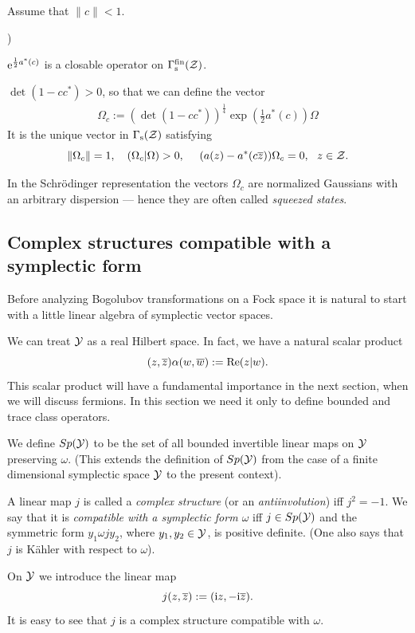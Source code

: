 \documentclass{svmult}
\newcounter{smallarabics}
\newenvironment{arabicenumerate}
{\begin{list}{{\normalfont\textrm{\arabic{smallarabics})}}}
  {\usecounter{smallarabics}\setlength{\itemindent}{0cm}
   \setlength{\leftmargin}{5ex}\setlength{\labelwidth}{4ex}
   \setlength{\topsep}{0.75\parsep}\setlength{\partopsep}{0ex}
   \setlength{\itemsep}{0ex}}}
{\end{list}}
\newcommand{\ben}{\begin{arabicenumerate}}
\newcommand{\een}{\end{arabicenumerate}}
\newcommand{\beq}{\begin{equation}}
\newcommand{\eeq}{\end{equation}}
\def\bet{\begin{theorem}}
\def\eet{\end{theorem}}
\def\Re{{\rm Re}}
\def\bar{\overline}
\def\s{{\rm s}}
\def\12{{\frac12}}
\def\cZ{{\cal Z}}
\def\cY{{\cal Y}}
\def\fin{{\rm fin}}
\def\i{{\rm i}}
\def\12{\frac{1}{2}}
\def\e{{\rm e}}
\def\12{\frac{1}{2}}
\def\e{{\rm e}}
\def\s{{\rm s}}
\begin{document}
 


\bet Assume that
 $\|c\|<1$.
\ben
\item $\e^{\frac12 a^*(c)}$ is 
 a closable operator on $\Gamma_\s^\fin(\cZ)$.
\item  
$\det(1-cc^*)>0$, so that we can define the vector
\beq\begin{array}{l}
\Omega_c:=\left(\det(1-cc^*)\right)^\frac{1}{4}\exp(\12
a^*(c))\Omega\end{array}\label{sq1}\eeq
 It is  
the unique vector in $\Gamma_\s(\cZ)$ satisfying
\[\|\Omega_c\|=1,\ \ \ (\Omega_c|\Omega)>0,\ \ \ \
(a(z)-a^*(c\bar z))\Omega_c=0,\ \ z\in\cZ.\]
\een\label{sqo}\eet
     

In the Schr\"odinger representation the vectors $\Omega_c$ are normalized
 Gaussians with
an arbitrary dispersion --- hence they are often called
 {\em squeezed states}.





\subsection{Complex structures compatible with a symplectic form}

Before analyzing Bogolubov transformations on a Fock space it is natural to
start with a little  linear algebra of symplectic vector spaces.

We can treat $\cY$ as a  real 
Hilbert space.
In fact, we have a natural scalar product
\[(z,\bar z)\alpha(w,\bar w):=\Re (z|w).\]
This scalar product will have a fundamental importance in the next section,
when we will discuss fermions. In this section we need it only to
define 
 bounded and trace class operators.




 We define $Sp(\cY)$ to be the set of
all bounded invertible linear maps on $\cY$ preserving $\omega$.
(This extends the definition of $Sp(\cY)$ from the case of a
finite dimensional
symplectic space $\cY$ to the present context).

A linear map $j$ is called a {\em complex structure} (or an {\em
  antiinvolution})  iff
$j^2=-1$. We say that it is {\em compatible with a symplectic form $\omega$} 
 iff
$j\in Sp(\cY)$ and the symmetric form $y_1\omega jy_2$, where $y_1,y_2\in\cY$,
 is positive definite.
(One also says that $j$ is K\"ahler with respect to $\omega$).

On $\cY$ we  introduce the linear map
\[j(z,\bar z):=(\i z,-\i \bar z).\]
It is easy to see that $j$ is a complex structure compatible  with $\omega$.
\end{document}
